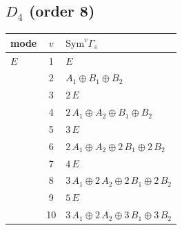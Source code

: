 \documentclass[11pt]{article}
\begin{document}
\subsection*{$D_{4}$ \quad (order 8)}
\begin{longtable}{l c p{}}
\hline mode & $v$ & $\mathrm{Sym}^v\Gamma_s$\\ \hline\endhead
$E$ & 1 & $E$\\
 & 2 & $A_{1}\oplus B_{1}\oplus B_{2}$\\
 & 3 & $2\,E$\\
 & 4 & $2\,A_{1}\oplus A_{2}\oplus B_{1}\oplus B_{2}$\\
 & 5 & $3\,E$\\
 & 6 & $2\,A_{1}\oplus A_{2}\oplus 2\,B_{1}\oplus 2\,B_{2}$\\
 & 7 & $4\,E$\\
 & 8 & $3\,A_{1}\oplus 2\,A_{2}\oplus 2\,B_{1}\oplus 2\,B_{2}$\\
 & 9 & $5\,E$\\
 & 10 & $3\,A_{1}\oplus 2\,A_{2}\oplus 3\,B_{1}\oplus 3\,B_{2}$\\
\hline
\end{longtable}
\end{document}
